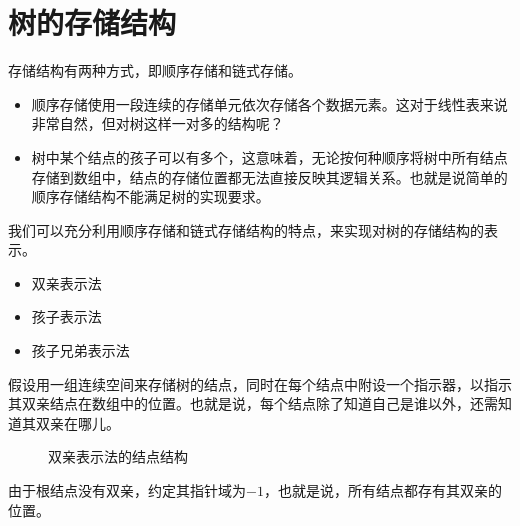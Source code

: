 \section{树的存储结构}

\begin{frame}\ft{\secname}
存储结构有两种方式，即顺序存储和链式存储。

\begin{itemize}
\item 顺序存储使用一段连续的存储单元依次存储各个数据元素。这对于线性表来说非常自然，但对树这样一对多的结构呢？
\item 树中某个结点的孩子可以有多个，这意味着，无论按何种顺序将树中所有结点存储到数组中，结点的存储位置都无法直接反映其逻辑关系。也就是说简单的顺序存储结构不能满足树的实现要求。
\end{itemize}
\end{frame}

\begin{frame}\ft{\secname}
我们可以充分利用顺序存储和链式存储结构的特点，来实现对树的存储结构的表示。
\end{frame}

\begin{frame}\ft{\secname}
\begin{itemize}
\item 双亲表示法
\item 孩子表示法
\item 孩子兄弟表示法
\end{itemize}
\end{frame}
 
\begin{frame}
假设用一组连续空间来存储树的结点，同时在每个结点中附设一个指示器，以指示其双亲结点在数组中的位置。也就是说，每个结点除了知道自己是谁以外，还需知道其双亲在哪儿。 \vspace{0.1in}

\begin{figure}
        
\caption{双亲表示法的结点结构}

\end{figure}
\end{frame}

\begin{frame}

\end{frame}
%
\begin{frame}
由于根结点没有双亲，约定其指针域为$-1$，也就是说，所有结点都存有其双亲的位置。
\end{frame}

